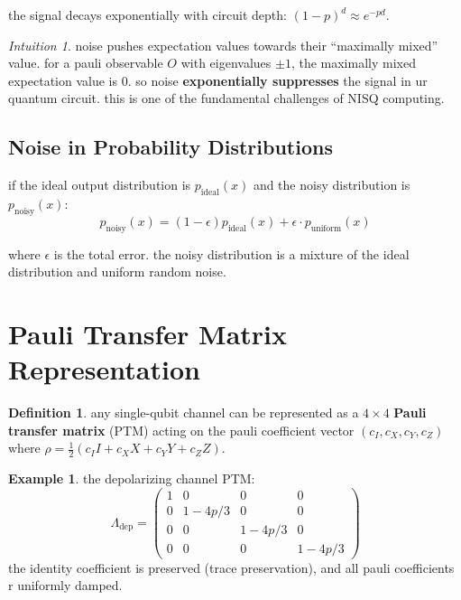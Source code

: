 \documentclass[11pt,a4paper]{article}
\theoremstyle{definition}
\newtheorem{definition}{Definition}[section]
\newtheorem{example}{Example}[section]
\theoremstyle{remark}
\newtheorem*{intuition}{Intuition}
\begin{document}
the signal decays exponentially with circuit depth: $(1-p)^d \approx e^{-pd}$.

\begin{intuition}
noise pushes expectation values towards their ``maximally mixed'' value. for a pauli observable $O$ with eigenvalues $\pm 1$, the maximally mixed expectation value is 0. so noise \textbf{exponentially suppresses} the signal in ur quantum circuit. this is one of the fundamental challenges of NISQ computing.
\end{intuition}

\subsection{Noise in Probability Distributions}

if the ideal output distribution is $p_{\text{ideal}}(x)$ and the noisy distribution is $p_{\text{noisy}}(x)$:
\[
p_{\text{noisy}}(x) = (1-\epsilon) p_{\text{ideal}}(x) + \epsilon \cdot p_{\text{uniform}}(x)
\]

where $\epsilon$ is the total error. the noisy distribution is a mixture of the ideal distribution and uniform random noise.

\section{Pauli Transfer Matrix Representation}

\begin{definition}
any single-qubit channel can be represented as a $4 \times 4$ \textbf{Pauli transfer matrix} (PTM) acting on the pauli coefficient vector $(c_I, c_X, c_Y, c_Z)$ where $\rho = \frac{1}{2}(c_I I + c_X X + c_Y Y + c_Z Z)$.
\end{definition}

\begin{example}
the depolarizing channel PTM:
\[
\Lambda_{\text{dep}} = \begin{pmatrix} 1 & 0 & 0 & 0 \\ 0 & 1-4p/3 & 0 & 0 \\ 0 & 0 & 1-4p/3 & 0 \\ 0 & 0 & 0 & 1-4p/3 \end{pmatrix}
\]
the identity coefficient is preserved (trace preservation), and all pauli coefficients r uniformly damped.
\end{example}
\end{document}

